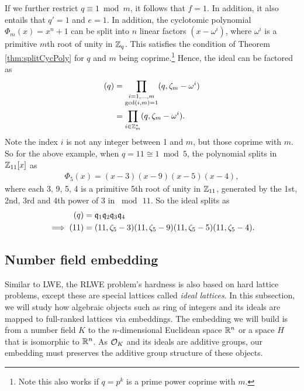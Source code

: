 \documentclass[../main.tex]{subfiles}
\begin{document}
If we further restrict $q \equiv 1 \bmod m$, it follows that $f=1$. In addition, it also entails that $q'=1$ and $e=1$. In addition, the cyclotomic polynomial $\Phi_m(x)=x^n+1$ can be split into $n$ linear factors $(x-\omega^i)$, where $\omega^i$ is a primitive $m$th root of unity in $\mathbb{Z}_q$. This satisfies the condition of Theorem \ref{thm:splitCycPoly} for $q$ and $m$ being coprime.\footnote{Note this also works if $q=p^k$ is a prime power coprime with $m$.} Hence, the ideal can be factored as 
\begin{align*}
    (q) %
    &= \prod_{\substack{i=1,\ldots,m \\ \gcd(i,m)=1}} (q, \zeta_m - \omega^i) \\%
    &=\prod_{i \in \Z_m^*} (q, \zeta_m - \omega^i).
\end{align*}
Note the index $i$ is not any integer between 1 and $m$, but those coprime with $m$. So for the above example, when $q=11 \cong 1 \bmod 5$, the polynomial splits in $\mathbb{Z}_{11}[x]$ as 
\begin{align*}
    \Phi_5(x)=(x-3)(x-9)(x-5)(x-4),
\end{align*}
where each 3, 9, 5, 4 is a primitive 5th root of unity in $\mathbb{Z}_{11}$, generated by the 1st, 2nd, 3rd and 4th power of 3 in $\bmod\, 11$. So the ideal splits as %
\begin{align*}
    (q)&=\mathfrak{q}_1 \mathfrak{q}_2 \mathfrak{q}_3 \mathfrak{q}_4 \\
    \implies (11)&=(11,\zeta_5-3)(11,\zeta_5-9)(11,\zeta_5-5)(11,\zeta_5-4).
\end{align*}



\subsection{Number field embedding}

Similar to LWE, the RLWE problem's hardness is also based on hard lattice problems, except these are special lattices called \textit{ideal lattices}. In this subsection, we will study how algebraic objects such as ring of integers and its ideals are mapped to full-ranked lattices via embeddings. The embedding we will build is from a number field $K$ to the $n$-dimensional Euclidean space $\mathbb{R}^n$ or a space $H$ that is isomorphic to $\mathbb{R}^n$. 
As $\mathcal{O}_K$ and its ideals are additive groups, our embedding must preserves the additive group structure of these objects.
\end{document}
